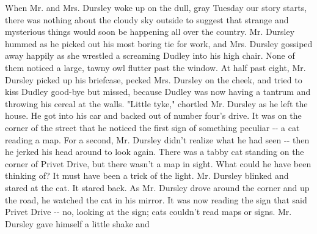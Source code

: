 \documentclass{article}%
\begin{document}
When Mr. and Mrs. Dursley woke up on the dull, gray Tuesday our story
\newline%
starts, there was nothing about the cloudy sky outside to suggest that
\newline%
strange and mysterious things would soon be happening all over the
\newline%
country. Mr. Dursley hummed as he picked out his most boring tie for
\newline%
work, and Mrs. Dursley gossiped away happily as she wrestled a screaming
\newline%
Dudley into his high chair.
\newline%
None of them noticed a large, tawny owl flutter past the window.
\newline%
At half past eight, Mr. Dursley picked up his briefcase, pecked Mrs.
\newline%
Dursley on the cheek, and tried to kiss Dudley good{-}bye but missed,
\newline%
because Dudley was now having a tantrum and throwing his cereal at the
\newline%
walls. "Little tyke," chortled Mr. Dursley as he left the house. He got
\newline%
into his car and backed out of number four's drive.
\newline%
It was on the corner of the street that he noticed the first sign of
\newline%
something peculiar {-}{-} a cat reading a map. For a second, Mr. Dursley
\newline%
didn't realize what he had seen {-}{-} then he jerked his head around to
\newline%
look again. There was a tabby cat standing on the corner of Privet
\newline%
Drive, but there wasn't a map in sight. What could he have been thinking
\newline%
of? It must have been a trick of the light. Mr. Dursley blinked and
\newline%
stared at the cat. It stared back. As Mr. Dursley drove around the
\newline%
corner and up the road, he watched the cat in his mirror. It was now
\newline%
reading the sign that said Privet Drive {-}{-} no, looking at the sign; cats
\newline%
couldn't read maps or signs. Mr. Dursley gave himself a little shake and
\newline%
\end{document}
